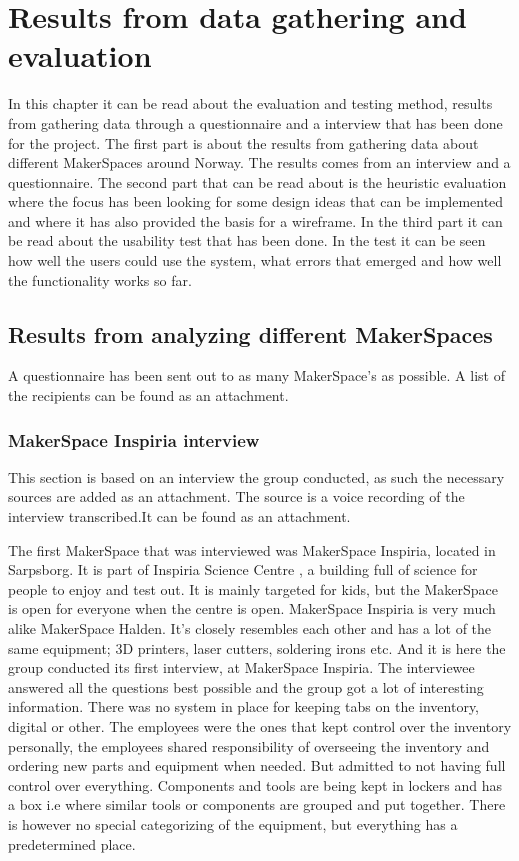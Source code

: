 \chapter{Results from data gathering and evaluation}
In this chapter it can be read about the evaluation and testing method, results from gathering data through a questionnaire and a interview that has been done for the project. The first part is about the results from gathering data about different MakerSpaces around Norway. The results comes from an interview and a questionnaire. The second part that can be read about is the heuristic evaluation where the focus has been looking for some design ideas that can be implemented and where it has also provided the basis for a wireframe. In the third part it can be read about the usability test that has been done. In the test it can be seen how well the users could use the system, what errors that emerged and how well the functionality works so far. 

\section{Results from analyzing different MakerSpaces}
 A questionnaire has been sent out to as many MakerSpace's as possible. A list of the recipients can be found as an attachment.    

\subsection{MakerSpace Inspiria interview}

This section is based on an interview the group conducted, as such the necessary sources are added as an attachment. The source is a voice recording of the interview transcribed.It can be found as an attachment.  

The first MakerSpace that was interviewed was MakerSpace Inspiria, located in Sarpsborg. It is part of Inspiria Science Centre \cite{Inspiria-SC}, a building full of science for people to enjoy and test out. It is mainly targeted for kids, but the MakerSpace is open for everyone when the centre is open. MakerSpace Inspiria is very much alike MakerSpace Halden. It's closely resembles each other and has a lot of the same equipment; 3D printers, laser cutters, soldering irons etc. 
And it is here the group conducted its first interview, at MakerSpace Inspiria. The interviewee answered all the questions best possible and the group got a lot of interesting information. There was no system in place for keeping tabs on the inventory, digital or other. The employees were the ones that kept control over the inventory personally, the employees shared responsibility of overseeing the inventory and ordering new parts and equipment when needed. But admitted to not having full control over everything. Components and tools are being kept in lockers and has a box i.e where similar tools or components are grouped and put together. There is however no special categorizing of the equipment, but everything has a predetermined place. 

